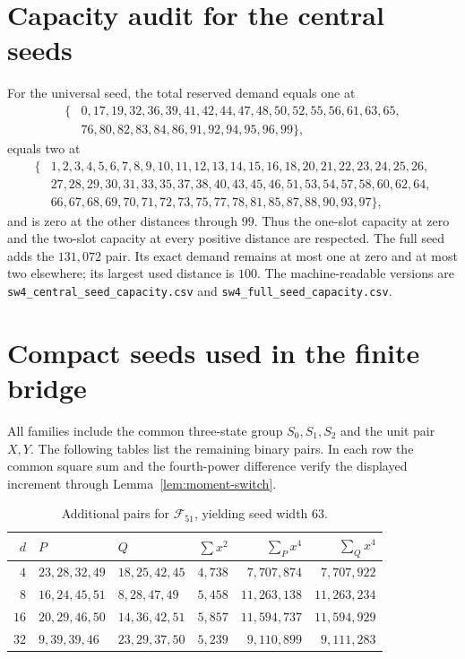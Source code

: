 \documentclass[11pt]{article}
\theoremstyle{definition}
\theoremstyle{remark}
\newcommand{\code}[1]{\nolinkurl{#1}}
\begin{document}
\section{Capacity audit for the central seeds}\label{app:capacity}

For the universal seed, the total reserved demand equals one at
\[
\begin{split}
\{&0,17,19,32,36,39,41,42,44,47,48,50,52,55,56,61,63,65,\\
  &76,80,82,83,84,86,91,92,94,95,96,99\},
\end{split}
\]
equals two at
\[
\begin{split}
\{&1,2,3,4,5,6,7,8,9,10,11,12,13,14,15,16,18,20,21,22,23,24,25,26,\\
  &27,28,29,30,31,33,35,37,38,40,43,45,46,51,53,54,57,58,60,62,64,\\
  &66,67,68,69,70,71,72,73,75,77,78,81,85,87,88,90,93,97\},
\end{split}
\]
and is zero at the other distances through $99$.  Thus the one-slot capacity
at zero and the two-slot capacity at every positive distance are respected.
The full seed adds the $131{,}072$ pair.  Its exact demand remains at most one
at zero and at most two elsewhere; its largest used distance is $100$.  The
machine-readable versions are \code{sw4_central_seed_capacity.csv} and
\code{sw4_full_seed_capacity.csv}.

\section{Compact seeds used in the finite bridge}\label{app:finite-seeds}

All families include the common three-state group $S_0,S_1,S_2$ and the unit
pair $X,Y$.  The following tables list the remaining binary pairs.  In each
row the common square sum and the fourth-power difference verify the displayed
increment through Lemma~\ref{lem:moment-switch}.

\begin{table}[ht]
\centering
\caption{Additional pairs for $\mathcal F_{51}$, yielding seed width $63$.}
\small
\begin{tabular}{@{}rllrrr@{}}
\toprule
$d$ & $P$ & $Q$ & $\sum x^2$ & $\sum_Px^4$ & $\sum_Qx^4$\\
\midrule
$4$ & $23,28,32,49$ & $18,25,42,45$ & $4{,}738$ & $7{,}707{,}874$ & $7{,}707{,}922$\\
$8$ & $16,24,45,51$ & $8,28,47,49$ & $5{,}458$ & $11{,}263{,}138$ & $11{,}263{,}234$\\
$16$ & $20,29,46,50$ & $14,36,42,51$ & $5{,}857$ & $11{,}594{,}737$ & $11{,}594{,}929$\\
$32$ & $9,39,39,46$ & $23,29,37,50$ & $5{,}239$ & $9{,}110{,}899$ & $9{,}111{,}283$\\
\bottomrule
\end{tabular}
\end{table}
\end{document}
